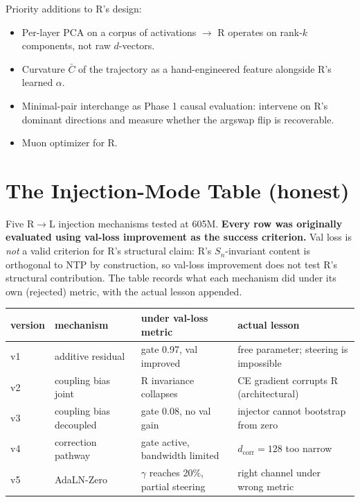 \documentclass[10pt, twocolumn, a4paper]{article}
\begin{document}
Priority additions to R's design:
\begin{itemize}[nosep]
\item Per-layer PCA on a corpus of activations $\to$ R operates on rank-$k$ components, not raw $d$-vectors.
\item Curvature $\bar C$ of the trajectory as a hand-engineered feature alongside R's learned $\alpha$.
\item Minimal-pair interchange as Phase 1 causal evaluation: intervene on R's dominant directions and measure whether the argswap flip is recoverable.
\item Muon optimizer for R.
\end{itemize}

\section{The Injection-Mode Table (honest)}

Five R$\to$L injection mechanisms tested at 605M. \textbf{Every row was originally evaluated using val-loss improvement as the success criterion.} Val loss is \emph{not} a valid criterion for R's structural claim: R's $S_n$-invariant content is orthogonal to NTP by construction, so val-loss improvement does not test R's structural contribution. The table records what each mechanism did under its own (rejected) metric, with the actual lesson appended.

\begin{center}\small
\begin{tabular}{llll}
\toprule
version & mechanism & under val-loss metric & actual lesson \\
\midrule
v1 & additive residual   & gate 0.97, val improved & free parameter; steering is impossible \\
v2 & coupling bias joint & R invariance collapses  & CE gradient corrupts R (architectural) \\
v3 & coupling bias decoupled & gate 0.08, no val gain & injector cannot bootstrap from zero \\
v4 & correction pathway  & gate active, bandwidth limited & $d_{\text{corr}}{=}128$ too narrow \\
v5 & AdaLN-Zero          & $\gamma$ reaches 20\%, partial steering & right channel under wrong metric \\
\bottomrule
\end{tabular}
\end{center}
\end{document}
